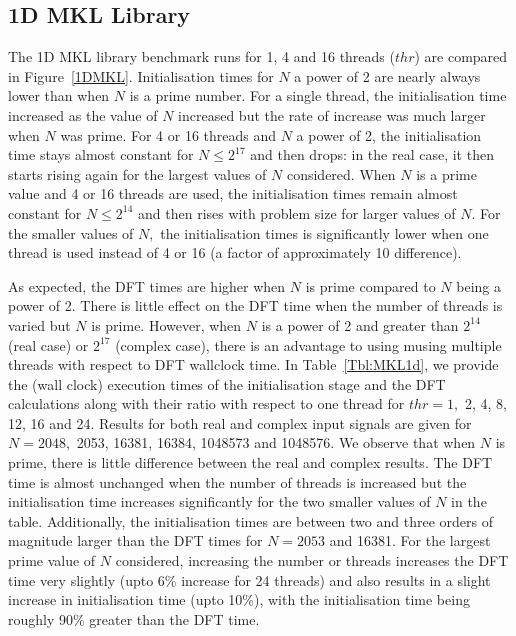 \documentclass[a4paper]{article}
\begin{document}
\subsection{1D MKL Library}\label{Sec:1DMKL}

The 1D MKL library benchmark runs for 1, 4 and 16 threads ($thr$) are compared
in Figure~\ref{1DMKL}. Initialisation times for $N$ a power of 2 are
nearly always lower than when $N$ is a prime number. For a single
thread, the initialisation time increased as the value of $N$
increased but the rate of increase was much larger when $N$ was
prime. For 4 or 16 threads and $N$ a power of 2, the initialisation
time stays almost constant for $N\le 2^{17}$ and then drops: in the
real case, it then starts rising again for the largest values of $N$
considered. When $N$ is a prime value and 4 or 16 threads are used,
the initialisation times remain almost constant for $N\le 2^{14}$ and
then rises with problem size for larger values of $N.$ For the smaller
values of $N,$ the initialisation times is significantly lower when
one thread is used instead of 4 or 16 (a factor of approximately 10
difference).

As expected, the DFT times are higher when $N$ is prime compared to
$N$ being a power of 2. There is little effect on the DFT time when
the number of threads is varied but $N$ is prime. However, when $N$ is
a power of 2 and greater than $2^{14}$ (real case) or $2^{17}$
(complex case), there is an advantage to using musing multiple threads
with respect to DFT wallclock time. In Table~\ref{Tbl:MKL1d}, we
provide the (wall clock) execution times of the initialisation stage
and the DFT calculations along with their ratio with respect to one
thread for $thr=1,$ 2, 4, 8, 12, 16 and 24. Results for both real and
complex input signals are given for $N=2048,$ 2053, 16381, 16384,
1048573 and 1048576. We observe that when $N$ is prime, there is
little difference between the real and complex results. The DFT time
is almost unchanged when the number of threads is increased but the
initialisation time increases significantly for the two smaller values
of $N$ in the table. Additionally, the initialisation times are
between two and three orders of magnitude larger than the DFT times
for $N=2053$ and 16381. For the largest prime value of $N$ considered,
increasing the number or threads increases the DFT time very slightly
(upto 6\% increase for 24 threads) and also results in a slight
increase in initialisation time (upto 10\%), with the initialisation
time being roughly 90\% greater than the DFT time.
\end{document}
